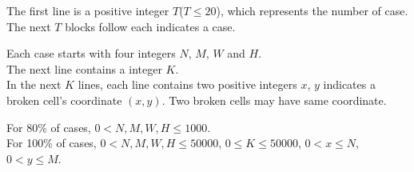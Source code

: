 The first line is a positive integer $T$($T \leq 20$), which represents the number of case. The next $T$ blocks follow each indicates a case.

Each case starts with four integers $N$, $M$, $W$ and $H$.\\
The next line contains a integer $K$.\\
In the next $K$ lines, each line contains two positive integers $x$, $y$ indicates a broken cell's coordinate $(x,y)$. Two broken cells may have same coordinate.

For 80\% of cases, $0 < N, M, W, H \leq 1000$.\\
For 100\% of cases, $0 < N, M, W, H \leq 50000$, $0 \leq K \leq 50000$, $0 < x \leq N$, $0 < y \leq M$.